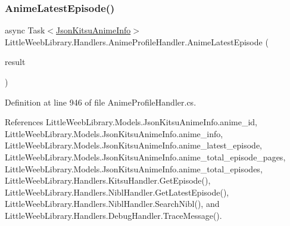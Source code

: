 \subsubsection{\texorpdfstring{Anime\+Latest\+Episode()}{AnimeLatestEpisode()}}
{\footnotesize\ttfamily async Task$<$\mbox{\hyperlink{class_little_weeb_library_1_1_models_1_1_json_kitsu_anime_info}{Json\+Kitsu\+Anime\+Info}}$>$ Little\+Weeb\+Library.\+Handlers.\+Anime\+Profile\+Handler.\+Anime\+Latest\+Episode (\begin{DoxyParamCaption}\item[{\mbox{\hyperlink{class_little_weeb_library_1_1_models_1_1_json_kitsu_anime_info}{Json\+Kitsu\+Anime\+Info}}}]{result }\end{DoxyParamCaption})\hspace{0.3cm}{\ttfamily [private]}}



Definition at line 946 of file Anime\+Profile\+Handler.\+cs.



References Little\+Weeb\+Library.\+Models.\+Json\+Kitsu\+Anime\+Info.\+anime\+\_\+id, Little\+Weeb\+Library.\+Models.\+Json\+Kitsu\+Anime\+Info.\+anime\+\_\+info, Little\+Weeb\+Library.\+Models.\+Json\+Kitsu\+Anime\+Info.\+anime\+\_\+latest\+\_\+episode, Little\+Weeb\+Library.\+Models.\+Json\+Kitsu\+Anime\+Info.\+anime\+\_\+total\+\_\+episode\+\_\+pages, Little\+Weeb\+Library.\+Models.\+Json\+Kitsu\+Anime\+Info.\+anime\+\_\+total\+\_\+episodes, Little\+Weeb\+Library.\+Handlers.\+Kitsu\+Handler.\+Get\+Episode(), Little\+Weeb\+Library.\+Handlers.\+Nibl\+Handler.\+Get\+Latest\+Episode(), Little\+Weeb\+Library.\+Handlers.\+Nibl\+Handler.\+Search\+Nibl(), and Little\+Weeb\+Library.\+Handlers.\+Debug\+Handler.\+Trace\+Message().


